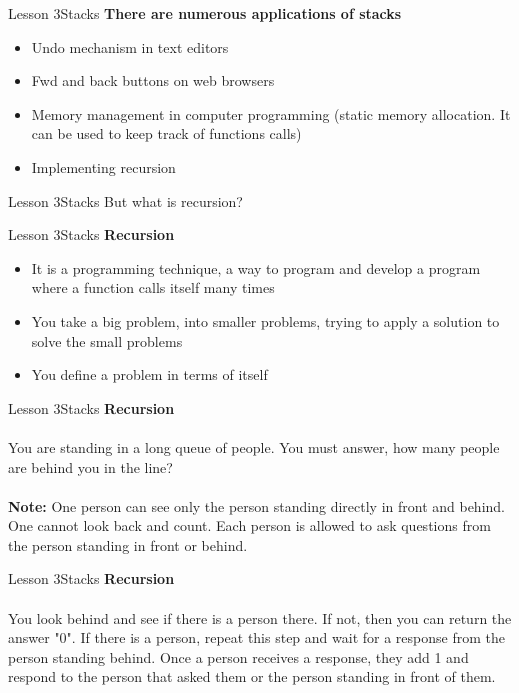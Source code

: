 \documentclass[aspectratio=1610]{beamer}
\begin{document}
\begin{frame}{Lesson 3}{Stacks}
\LARGE
\textbf{There are numerous applications of stacks}\\
\begin{itemize}
    \item Undo mechanism in text editors
    \item Fwd and back buttons on web browsers
    \item Memory management in computer programming (static memory allocation. It can be used to keep track of functions calls)
    \item Implementing \alert{recursion}
\end{itemize}
\end{frame}



\begin{frame}{Lesson 3}{Stacks}
\Huge
 But what is recursion?
\end{frame}


\begin{frame}{Lesson 3}{Stacks}
\LARGE
\textbf{Recursion}\\
\begin{itemize}
    \item It is a programming technique, a way to program and develop a program where a function calls itself many times
    \item You take a big problem, into smaller problems, trying to apply a solution to solve the small problems
    \item You define a problem in terms of itself 
\end{itemize}
\end{frame}


\begin{frame}{Lesson 3}{Stacks}
\LARGE
\textbf{Recursion}\\~\\
You are standing in a long queue of people. You must answer, how many
people are behind you in the line?\\~\\
\large
\textbf{Note:}
One person can see only the person standing directly in front and
behind. One cannot look back and count. Each person is allowed to ask
questions from the person standing in front or behind.
\end{frame}


\begin{frame}{Lesson 3}{Stacks}
\LARGE
\textbf{Recursion}\\~\\
You look behind and see if there is a person there. If not, then you
can return the answer "0". If there is a person, repeat this step 
and wait for a response from the person standing behind. Once a
person receives a response, they add 1 and respond to the person
that asked them or the person standing in front of them.
\end{frame}
\end{document}
